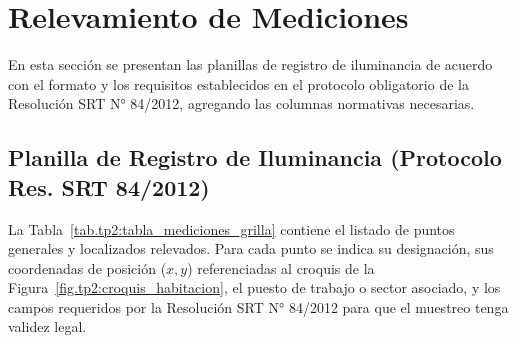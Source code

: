\chapter{Relevamiento de Mediciones}
\label{sec.tp2:mediciones}

En esta sección se presentan las planillas de registro de iluminancia de acuerdo con el formato y los requisitos
establecidos en el protocolo obligatorio de la Resolución SRT N° 84/2012, agregando las columnas normativas
necesarias.

\section{Planilla de Registro de Iluminancia (Protocolo Res. SRT 84/2012)}
\label{sec.tp2:registro_mediciones}

La Tabla~\ref{tab.tp2:tabla_mediciones_grilla} contiene el listado de puntos generales y localizados relevados. Para cada
punto se indica su designación, sus coordenadas de posición ($x, y$) referenciadas al croquis de la
Figura~\ref{fig.tp2:croquis_habitacion}, el puesto de trabajo o sector asociado, y los campos requeridos por la
Resolución SRT N° 84/2012 para que el muestreo tenga validez legal.

